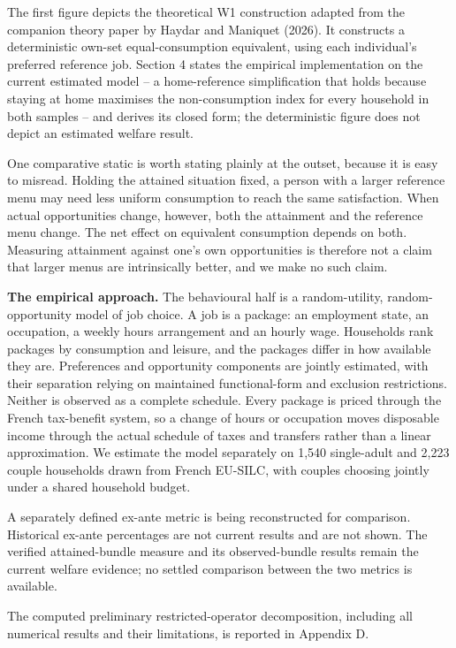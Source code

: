 \documentclass[11pt,a4paper]{article}
\begin{document}
The first figure depicts the theoretical W1 construction adapted from the companion theory paper by Haydar and Maniquet (2026). It constructs a deterministic own-set equal-consumption equivalent, using each individual's preferred reference job. Section 4 states the empirical implementation on the current estimated model -- a home-reference simplification that holds because staying at home maximises the non-consumption index for every household in both samples -- and derives its closed form; the deterministic figure does not depict an estimated welfare result.

One comparative static is worth stating plainly at the outset, because it is easy to misread. Holding the attained situation fixed, a person with a larger reference menu may need less uniform consumption to reach the same satisfaction. When actual opportunities change, however, both the attainment and the reference menu change. The net effect on equivalent consumption depends on both. Measuring attainment against one's own opportunities is therefore not a claim that larger menus are intrinsically better, and we make no such claim.

\textbf{The empirical approach.} The behavioural half is a random-utility, random-opportunity model of job choice. A job is a package: an employment state, an occupation, a weekly hours arrangement and an hourly wage. Households rank packages by consumption and leisure, and the packages differ in how available they are. Preferences and opportunity components are jointly estimated, with their separation relying on maintained functional-form and exclusion restrictions. Neither is observed as a complete schedule. Every package is priced through the French tax-benefit system, so a change of hours or occupation moves disposable income through the actual schedule of taxes and transfers rather than a linear approximation. We estimate the model separately on 1,540 single-adult and 2,223 couple households drawn from French EU-SILC, with couples choosing jointly under a shared household budget.

A separately defined ex-ante metric is being reconstructed for comparison. Historical ex-ante percentages are not current results and are not shown. The verified attained-bundle measure and its observed-bundle results remain the current welfare evidence; no settled comparison between the two metrics is available.

The computed preliminary restricted-operator decomposition, including all numerical results and their limitations, is reported in Appendix D.
\end{document}
